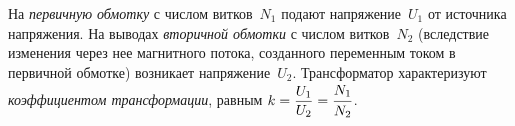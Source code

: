 \documentclass[main.tex]{subfiles}
\begin{document}
На \emph{первичную обмотку} с числом витков~$N_1$ подают напряжение~$U_1$ от источника напряжения. На выводах \emph{вторичной обмотки} с числом витков~$N_2$ (вследствие изменения через нее магнитного потока, созданного переменным током в первичной обмотке) возникает напряжение~$U_2$. Трансформатор характеризуют \emph{коэффициентом трансформации}, равным $k=\dfrac{U_1}{U_2}=\dfrac{N_1\strut}{N_2\strut}$.  



 
\end{document}
